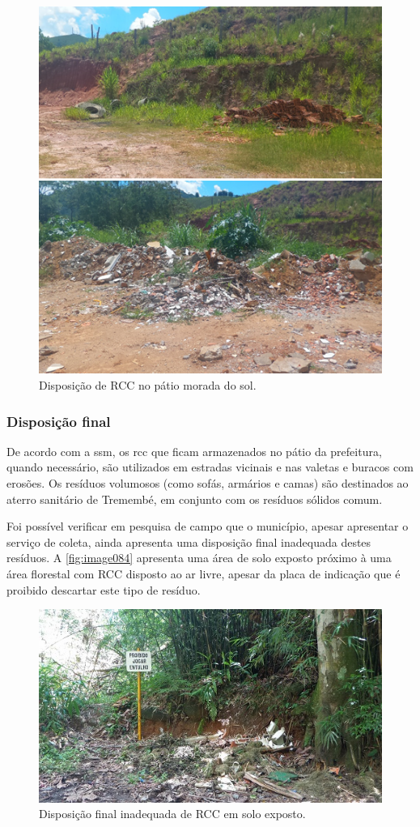 \begin{figure}
	\centering
	\includegraphics[width=0.7\linewidth]{produtos/prodtres/image083}
	\caption{Disposição de RCC no pátio morada do sol.}
	\label{fig:image083}
\end{figure}


\subsubsection{Disposição final}
De acordo com a \gls{ssm}, os \gls{rcc} que ficam armazenados no pátio da prefeitura, quando necessário, são utilizados em estradas vicinais e nas valetas e buracos com erosões. Os resíduos volumosos (como sofás, armários e camas) são destinados ao aterro sanitário de Tremembé, em conjunto com os resíduos sólidos comum.

Foi possível verificar em pesquisa de campo que o município, apesar apresentar o serviço de coleta, ainda apresenta uma disposição final inadequada destes resíduos. A \autoref{fig:image084} apresenta uma área de solo exposto próximo à uma área florestal com RCC disposto ao ar livre, apesar da placa de indicação que é proibido descartar este tipo de resíduo.

\begin{figure}
	\centering
	\includegraphics[width=0.7\linewidth]{produtos/prodtres/image084}
	\caption{Disposição final inadequada de RCC em solo exposto.}
	\label{fig:image084}
\end{figure}


